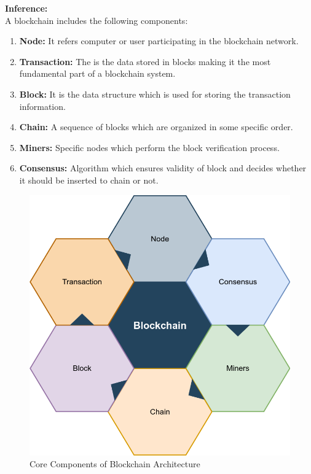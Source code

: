 \documentclass[oneside, 12pt]{book}
\begin{document}
\begin{enumerate}
	      \textbf{Inference:}
	      \\A blockchain includes the following components:
	      \begin{enumerate}[i]
		      \item\textbf{Node:} It refers computer or user participating in the blockchain network.
		      \item\textbf{Transaction:} The is the data stored in blocks making it the most fundamental part of a blockchain system.
		      \item\textbf{Block:} It is the data structure which is used for storing the transaction information.
		      \item\textbf{Chain:} A sequence of blocks which are organized in some specific order.
		      \item\textbf{Miners:} Specific nodes which perform the block verification process.
		      \item\textbf{Consensus:} Algorithm which ensures validity of block and decides whether it should be inserted to chain or not.
	      \end{enumerate}
	      \begin{figure}[H]
		      \centering
		      \includegraphics[width=0.6\linewidth]{./Resources/core-components.png}
		      \caption{Core Components of Blockchain Architecture}
		      \label{fig:core-components}
	      \end{figure}
\end{enumerate}
\end{document}
